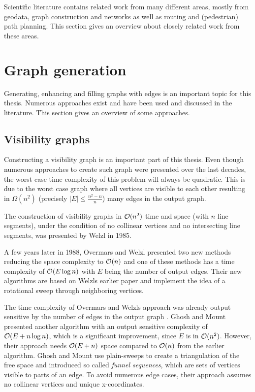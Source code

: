 
Scientific literature contains related work from many different areas, mostly from geodata, graph construction and networks as well as routing and (pedestrian) path planning.
This section gives an overview about closely related work from these areas.

\section{Graph generation}
\label{sec:graph-generation}

	Generating, enhancing and filling graphs with edges is an important topic for this thesis.
	Numerous approaches exist and have been used and discussed in the literature.
	This section gives an overview of some approaches.

	\subsection{Visibility graphs}
	\label{subsec:related-work:visibility-graph}

		Constructing a visibility graph is an important part of this thesis.
		Even though numerous approaches to create such graph were presented over the last decades, the worst-case time complexity of this problem will always be quadratic.
		This is due to the worst case graph where all vertices are visible to each other resulting in $\Omega(n^2)$ (precisely $|E| \leq \frac{n^2-n}{n}$) many edges in the output graph.
		
		The construction of visibility graphs in $\mathcal{O}(n^2)$ time and space (with $n$ line segments), under the condition of no collinear vertices and no intersecting line segments, was presented by Welzl in 1985\cite{welzl-visibility-graph}.
		
		A few years later in 1988, Overmars and Welzl presented two new methods reducing the space complexity to $\mathcal{O}(n)$ \cite{overmars-weizl-visibility-graph} and one of these methods has a time complexity of $\mathcal{O}(E \log n)$ with $E$ being the number of output edges.
		Their new algorithms are based on Welzls earlier paper and implement the idea of a rotational sweep through neighboring vertices.
		
		The time complexity of Overmars and Welzls approach was already output sensitive by the number of edges in the output graph \cite{ghosh-output-sensitive-vgraph}.
		Ghosh and Mount presented another algorithm with an output sensitive complexity of $\mathcal{O}(E + n \log n)$, which is a significant improvement, since $E$ is in $\mathcal{O}(n^2)$.
		However, their approach needs $\mathcal{O}(E + n)$ space compared to $\mathcal{O}(n)$ from the earlier algorithm.
		Ghosh and Mount use plain-sweeps to create a triangulation of the free space and introduced so called \emph{funnel sequences}, which are sets of vertices visible to parts of an edge.
		To avoid numerous edge cases, their approach assumes no collinear vertices and unique x-coordinates.
		
